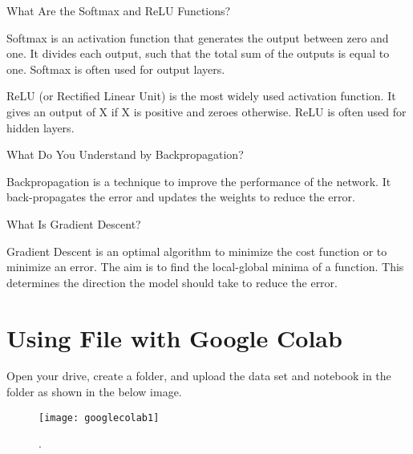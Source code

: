 	\begin{qanda}
		\begin{question}
What Are the Softmax and ReLU Functions?
		\end{question}
		\begin{answer}
Softmax is an activation function that generates the output between zero and one. It divides each output, such that the total sum of the outputs is equal to one. Softmax is often used for output layers.

ReLU (or Rectified Linear Unit) is the most widely used activation function. It gives an output of X if X is positive and zeroes otherwise. ReLU is often used for hidden layers.
		\end{answer}
	\end{qanda}

	\begin{qanda}
		\begin{question}
What Do You Understand by Backpropagation?
		\end{question}
		\begin{answer}
Backpropagation is a technique to improve the performance of the network. It back-propagates the error and updates the weights to reduce the error.
		\end{answer}
	\end{qanda}

	\begin{qanda}
		\begin{question}
What Is Gradient Descent?
		\end{question}
		\begin{answer}
Gradient Descent is an optimal algorithm to minimize the cost function or to minimize an error. The aim is to find the local-global minima of a function. This determines the direction the model should take to reduce the error.
		\end{answer}
	\end{qanda}

	\section{Using File with Google Colab}

Open your drive, create a folder, and upload the data set and notebook in the folder as shown in the below image.

	\begin{figure}[h]
		\centering
		\texttt{[image: googlecolab1]}
		\caption{.}
		\label{fig:googlecolab1}
	\end{figure}

